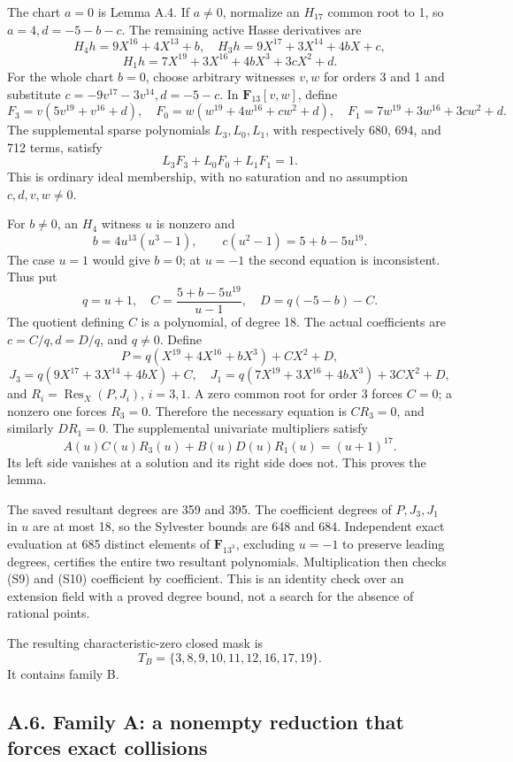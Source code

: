 \documentclass[
  british,
  10pt,
  a4paper,
]{article}
\newcounter{none} %
\begin{document}
The chart \(a=0\) is Lemma A.4. If \(a\ne0\), normalize an \(H_{17}\)
common root to 1, so \(a=4,d=-5-b-c\). The remaining active Hasse
derivatives are \[
H_4h=9X^{16}+4X^{13}+b,\quad
H_3h=9X^{17}+3X^{14}+4bX+c,
\] \[
H_1h=7X^{19}+3X^{16}+4bX^3+3cX^2+d.
\] For the whole chart \(b=0\), choose arbitrary witnesses \(v,w\) for
orders 3 and 1 and substitute \(c=-9v^{17}-3v^{14},d=-5-c\). In
\(\mathbf F_{13}[v,w]\), define \[
F_3=v(5v^{19}+v^{16}+d),\quad
F_0=w(w^{19}+4w^{16}+cw^2+d),\quad
F_1=7w^{19}+3w^{16}+3cw^2+d.
\] The supplemental sparse polynomials \(L_3,L_0,L_1\), with
respectively 680, 694, and 712 terms, satisfy \[
L_3F_3+L_0F_0+L_1F_1=1.
\tag{S9}
\] This is ordinary ideal membership, with no saturation and no
assumption \(c,d,v,w\ne0\).

For \(b\ne0\), an \(H_4\) witness \(u\) is nonzero and \[
b=4u^{13}(u^3-1),\qquad c(u^2-1)=5+b-5u^{19}.
\] The case \(u=1\) would give \(b=0\); at \(u=-1\) the second equation
is inconsistent. Thus put \[
q=u+1,\quad C=\frac{5+b-5u^{19}}{u-1},\quad D=q(-5-b)-C.
\] The quotient defining \(C\) is a polynomial, of degree 18. The actual
coefficients are \(c=C/q,d=D/q\), and \(q\ne0\). Define \[
P=q(X^{19}+4X^{16}+bX^3)+CX^2+D,
\] \[
J_3=q(9X^{17}+3X^{14}+4bX)+C,\quad
J_1=q(7X^{19}+3X^{16}+4bX^3)+3CX^2+D,
\] and \(R_i=\operatorname{Res}_X(P,J_i)\), \(i=3,1\). A zero common
root for order 3 forces \(C=0\); a nonzero one forces \(R_3=0\).
Therefore the necessary equation is \(CR_3=0\), and similarly
\(DR_1=0\). The supplemental univariate multipliers satisfy \[
A(u)C(u)R_3(u)+B(u)D(u)R_1(u)=(u+1)^{17}.
\tag{S10}
\] Its left side vanishes at a solution and its right side does not.
This proves the lemma.

The saved resultant degrees are 359 and 395. The coefficient degrees of
\(P,J_3,J_1\) in \(u\) are at most 18, so the Sylvester bounds are 648
and 684. Independent exact evaluation at 685 distinct elements of
\(\mathbf F_{13^3}\), excluding \(u=-1\) to preserve leading degrees,
certifies the entire two resultant polynomials. Multiplication then
checks (S9) and (S10) coefficient by coefficient. This is an identity
check over an extension field with a proved degree bound, not a search
for the absence of rational points.

The resulting characteristic-zero closed mask is \[
T_B=\{3,8,9,10,11,12,16,17,19\}.
\] It contains family B.

\subsection*{A.6. Family A: a nonempty reduction that forces exact
collisions}\label{a.6.-family-a-a-nonempty-reduction-that-forces-exact-collisions}
\end{document}
